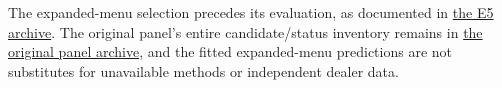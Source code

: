 The expanded-menu selection precedes its evaluation, as documented in \href{https://github.com/ByronLi0207/financial-mathematics-paper-20261020/blob/revision-v7-final/results/supervisor-20261023/e5/README.md}{the E5 archive}. The original panel's entire candidate/status inventory remains in
\href{https://github.com/ByronLi0207/financial-mathematics-paper-20261020/blob/revision-v7-final/results/revision-20261023/round2/panel/summary.csv}{the original panel archive},
and the fitted expanded-menu predictions are not substitutes for unavailable
methods or independent dealer data.